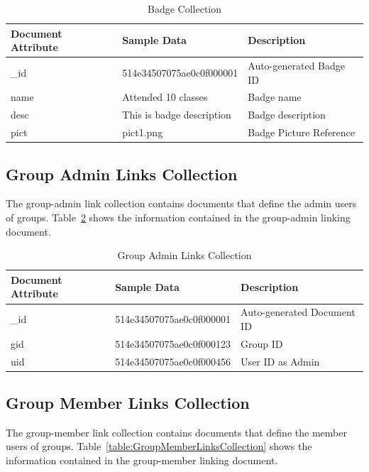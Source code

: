 \begin{table}[H]
\caption{Badge Collection}\label{table:BadgeCollection}
\vspace{-0.2in}
\textbf{ }
\begin{center}
\begin{tabular}{ | l | l |  l | }
\hline
Document Attribute & Sample Data & Description \\ \hline
{\_}id & 514e34507075ae0c0f000001 & Auto-generated Badge ID \\ \hline
name & Attended 10 classes & Badge name   \\ \hline
desc & This is badge description & Badge description   \\ \hline
pict & pict1.png & Badge Picture Reference   \\ \hline
\end{tabular}
\end{center}
\end{table}


\subsection{Group Admin Links Collection}
The group-admin link collection contains documents that define the admin users of groups.  Table~\ref{table:GroupAdminLinksCollection} shows the information contained in the group-admin linking document.

\begin{table}[H]
\caption{Group Admin Links Collection}\label{table:GroupAdminLinksCollection}
\vspace{-0.2in}
\textbf{ }
\begin{center}
\begin{tabular}{ | l | l |  l | }
\hline
Document Attribute & Sample Data & Description \\ \hline
{\_}id & 514e34507075ae0c0f000001 & Auto-generated Document ID \\ \hline
gid & 514e34507075ae0c0f000123 & Group ID   \\ \hline
uid & 514e34507075ae0c0f000456 & User ID as Admin   \\ \hline
\end{tabular}
\end{center}
\end{table}

\subsection{Group Member Links Collection}
The group-member link collection contains documents that define the member users of groups. Table~\ref{table:GroupMemberLinksCollection} shows the information contained in the group-member linking document.

